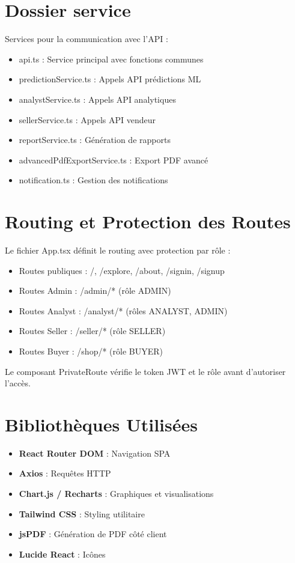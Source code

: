 \documentclass[12pt,a4paper]{report}
\begin{document}
\section{Dossier service}

Services pour la communication avec l'API :

\begin{itemize}[noitemsep]
    \item api.ts : Service principal avec fonctions communes
    \item predictionService.ts : Appels API prédictions ML
    \item analystService.ts : Appels API analytiques
    \item sellerService.ts : Appels API vendeur
    \item reportService.ts : Génération de rapports
    \item advancedPdfExportService.ts : Export PDF avancé
    \item notification.ts : Gestion des notifications
\end{itemize}

\section{Routing et Protection des Routes}

Le fichier App.tsx définit le routing avec protection par rôle :

\begin{itemize}[noitemsep]
    \item Routes publiques : /, /explore, /about, /signin, /signup
    \item Routes Admin : /admin/* (rôle ADMIN)
    \item Routes Analyst : /analyst/* (rôles ANALYST, ADMIN)
    \item Routes Seller : /seller/* (rôle SELLER)
    \item Routes Buyer : /shop/* (rôle BUYER)
\end{itemize}

Le composant PrivateRoute vérifie le token JWT et le rôle avant d'autoriser l'accès.

\section{Bibliothèques Utilisées}

\begin{itemize}[noitemsep]
    \item \textbf{React Router DOM} : Navigation SPA
    \item \textbf{Axios} : Requêtes HTTP
    \item \textbf{Chart.js / Recharts} : Graphiques et visualisations
    \item \textbf{Tailwind CSS} : Styling utilitaire
    \item \textbf{jsPDF} : Génération de PDF côté client
    \item \textbf{Lucide React} : Icônes
\end{itemize}
\end{document}
